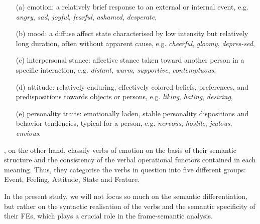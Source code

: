 \documentclass[output=paper,colorlinks,citecolor=brown]{langscibook}
\begin{document}
\begin{itemize}
\item[(a)] emotion: a relatively brief response to an external or internal   event, e.g. \textit{angry}, \textit{sad}, \textit{joyful}, \textit{fearful}, \textit{ashamed}, \textit{desperate}, 

\item[(b)] mood: a diffuse affect state characterised by low intensity but relatively long duration, often without apparent cause, e.g. \textit{cheerful}, \textit{gloomy}, \textit{depres-sed}, 

\item[(c)] interpersonal stance: affective stance taken toward another person in a specific interaction, e.g. \textit{distant}, \textit{warm}, \textit{supportive}, \textit{contemptuous},

\item[(d)] attitude: relatively enduring, effectively colored beliefs, preferences, and predispositions towards objects or persons, e.g. \textit{liking}, \textit{hating}, \textit{desiring}, 

\item[(e)] personality traits: emotionally laden, stable personality dispositions and behavior tendencies, typical for a person, e.g. \textit{nervous}, \textit{hostile}, \textit{jealous}, \textit{envious}. 
 \end{itemize}

\citet{ляшевская2011онтологические}, on the other hand, classify verbs of emotion on the basis of their semantic structure and the consistency of the verbal operational functors contained in each meaning. Thus, they categorise the verbs in question into five different groups: Event, Feeling, Attitude, State and Feature.

In the present study, we will not focus so much on the semantic differentiation, but rather on the syntactic realisation of the verbs and  the semantic specificity of their FEs, which plays a crucial role in the frame-semantic analysis.
\end{document}
